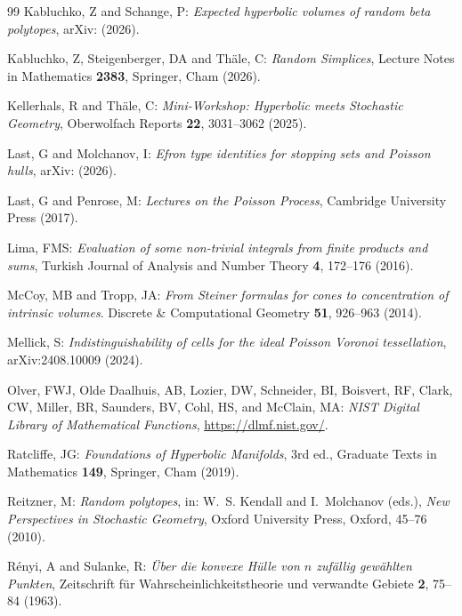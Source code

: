 \documentclass[11pt,a4paper]{article}
\theoremstyle{plain}
\theoremstyle{definition}
\theoremstyle{remark}
\begin{document}
\begin{thebibliography}{99}
	Kabluchko, Z and Schange, P:
	\emph{Expected hyperbolic volumes of random beta polytopes},
	arXiv: (2026).

	Kabluchko, Z, Steigenberger, DA and Th\"ale, C:
	\emph{Random Simplices},
	Lecture Notes in Mathematics \textbf{2383}, Springer, Cham (2026).

	Kellerhals, R and Th{\"a}le, C:
	\emph{Mini-Workshop: Hyperbolic meets Stochastic Geometry},
	Oberwolfach Reports \textbf{22}, 3031--3062 (2025).

	Last, G and Molchanov, I:
	\emph{Efron type identities for stopping sets and Poisson hulls},
	arXiv: (2026).

	Last, G and Penrose, M:
	\emph{Lectures on the Poisson Process},
	Cambridge University Press (2017).

	Lima, FMS:
	\emph{Evaluation of some non-trivial integrals from finite products and sums},
	Turkish Journal of Analysis and Number Theory \textbf{4}, 172--176 (2016).

    McCoy, MB and Tropp, JA:
    \emph{From Steiner formulas for cones to concentration
    of intrinsic volumes}.
    Discrete \& Computational Geometry \textbf{51}, 926--963 (2014).

	Mellick, S:
	\emph{Indistinguishability of cells for the ideal Poisson Voronoi tessellation},
	arXiv:2408.10009 (2024).

	Olver, FWJ, Olde Daalhuis, AB, Lozier, DW, Schneider, BI, Boisvert, RF,
	Clark, CW, Miller, BR, Saunders, BV, Cohl, HS, and McClain, MA:
	\emph{NIST Digital Library of Mathematical Functions},
	\url{https://dlmf.nist.gov/}.

	Ratcliffe, JG:
	\emph{Foundations of Hyperbolic Manifolds},
	3rd ed., Graduate Texts in Mathematics \textbf{149},
	Springer, Cham (2019).

	Reitzner, M:
	\emph{Random polytopes},
	in: W.~S. Kendall and I.~Molchanov (eds.),
	\emph{New Perspectives in Stochastic Geometry},
	Oxford University Press, Oxford, 45--76 (2010).

	R\'enyi, A and Sulanke, R:
	\emph{\"Uber die konvexe H\"ulle von $n$ zuf\"allig gew\"ahlten Punkten},
	Zeitschrift für Wahrscheinlichkeitstheorie und verwandte Gebiete \textbf{2}, 75--84 (1963).


\end{thebibliography}
\end{document}

